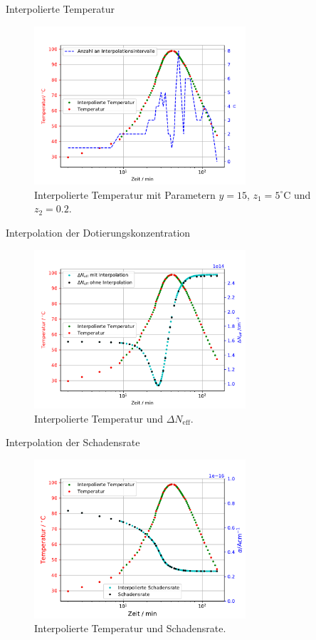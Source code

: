 \documentclass[aspectratio=43, 10pt]{beamer}
\begin{document}
\begin{frame}{Interpolierte Temperatur}
  \begin{figure}
      \includegraphics[width=0.7\textwidth]{images/interpolation_steps.PDF}
  \caption{Interpolierte Temperatur mit Parametern $y=15$, $z_1=5^\circ$C und $z_2 = 0.2$.}
  \end{figure}
\end{frame}

\begin{frame}{Interpolation der Dotierungskonzentration}
  \begin{figure}
      \includegraphics[width=0.7\textwidth]{images/interpolation_cyan.PDF}
  \caption{Interpolierte Temperatur und $\Delta N_{\mathrm{eff}}$.}
  \end{figure}
\end{frame}


\begin{frame}{Interpolation der Schadensrate}
  \begin{figure}
      \includegraphics[width=0.7\textwidth]{images/damage_interpolation_cyan.PDF}
  \caption{Interpolierte Temperatur und Schadensrate.}
  \end{figure}
\end{frame}
\end{document}
